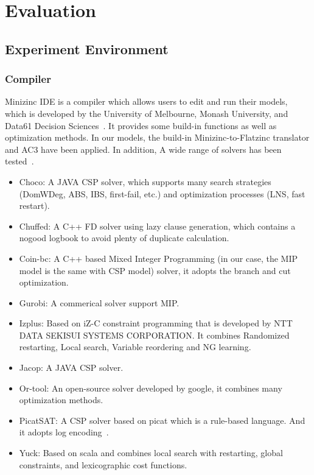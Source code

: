 \chapter{Evaluation}
\label{cha:evaluation}
\section{Experiment Environment}
\subsection{Compiler}
\label{section:compiler}
Minizinc IDE is a compiler which allows users to edit and run their models, which is developed by the University of Melbourne, Monash University, and Data61 Decision Sciences~\cite{r6}. It provides some build-in functions as well as optimization methods. In our models, the build-in Minizinc-to-Flatzinc translator and AC3 have been applied. In addition, A wide range of solvers has been tested~\cite{r6}.
\begin{itemize}
    \item Choco: A JAVA CSP solver, which supports many search strategies (DomWDeg, ABS, IBS, first-fail, etc.) and optimization processes (LNS, fast restart).
    \item Chuffed: A C++ FD solver using lazy clause generation, which contains a nogood logbook to avoid plenty of duplicate calculation.
    \item Coin-bc: A C++ based Mixed Integer Programming (in our case, the MIP model is the same with CSP model) solver, it adopts the branch and cut optimization.
    \item Gurobi: A commerical solver support MIP.
    \item Izplus: Based on iZ-C constraint programming that is developed by NTT DATA SEKISUI SYSTEMS CORPORATION. It combines Randomized restarting, Local search, Variable reordering and NG learning.
    \item Jacop: A JAVA CSP solver.
    \item Or-tool: An open-source solver developed by google, it combines many optimization methods.
    \item PicatSAT: A CSP solver based on picat which is a rule-based language. And it adopts log encoding~\cite{r8}.
    \item Yuck: Based on scala and combines local search with restarting, global constraints, and lexicographic cost functions.
\end{itemize}
